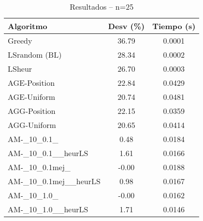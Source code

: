 \begin{table}[ht]
  \centering
  \caption{Resultados – n=25}
  \begin{tabular}{lcc}
  \hline
  Algoritmo & Desv (\%) & Tiempo (s) \\
  \hline
  Greedy & 36.79 & 0.0001 \\
  LSrandom (BL) & 28.34 & 0.0002 \\
  LSheur & 26.70 & 0.0003 \\
  AGE-Position & 22.84 & 0.0429 \\
  AGE-Uniform & 20.74 & 0.0481 \\
  AGG-Position & 22.15 & 0.0359 \\
  AGG-Uniform & 20.65 & 0.0414 \\
  AM-\_10\_0.1\_ & 0.48 & 0.0184 \\
  AM-\_10\_0.1\_\_heurLS & 1.61 & 0.0166 \\
  AM-\_10\_0.1mej\_ & -0.00 & 0.0188 \\
  AM-\_10\_0.1mej\_\_heurLS & 0.98 & 0.0167 \\
  AM-\_10\_1.0\_ & -0.00 & 0.0162 \\
  AM-\_10\_1.0\_\_heurLS & 1.71 & 0.0146 \\
  \hline
  \end{tabular}
\end{table}